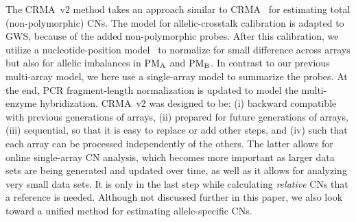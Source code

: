 \documentclass{bioinfo}
\newcommand{\GWS}{GWS\xspace}
\newcommand{\PMA}{\ensuremath{\textnormal{PM}_\textnormal{A}}\xspace}
\newcommand{\PMB}{\ensuremath{\textnormal{PM}_\textnormal{B}}\xspace}
\begin{document}
The CRMA~v2 method takes an approach similar to CRMA~\citep{BengtssonH_etal_2008} for estimating total (non-polymorphic) CNs.  The model for allelic-crosstalk calibration is adapted to \GWS, because of the added non-polymorphic probes.  After this calibration, we utilize a nucleotide-position model~\citep{CarvalhoB_etal_2007} to normalize for small difference across arrays but also for allelic imbalances in \PMA and \PMB.  
In contrast to our previous multi-array model, we here use a single-array model to summarize the probes.  At the end, PCR fragment-length normalization is updated to model the multi-enzyme hybridization.
CRMA~v2 was designed to be:
(i) backward compatible with previous generations of arrays,
(ii) prepared for future generations of arrays, 
(iii) sequential, so that it is easy to replace or add other steps, and
(iv) such that each array can be processed independently of the others.
The latter allows for online single-array CN analysis, which becomes more important as larger data sets are being generated and updated over time, as well as it allows for analyzing very small data sets.
It is only in the last step while calculating \emph{relative} CNs that a reference is needed.
Although not discussed further in this paper, we also look toward a unified method for estimating allele-specific CNs.
\end{document}
